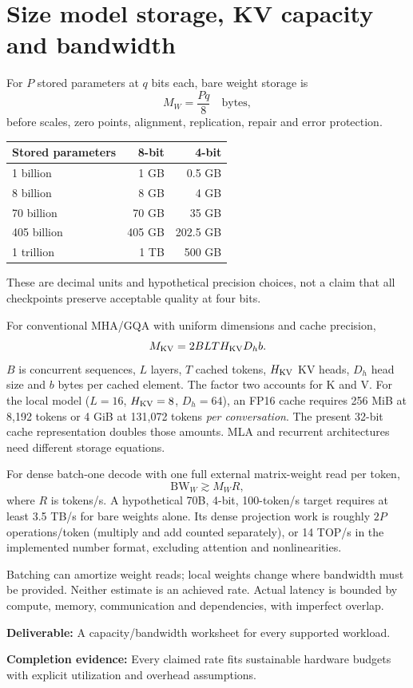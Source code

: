 \documentclass[11pt,a4paper]{article}
\newcommand{\phase}[2]{\clearpage\section{#1}\label{#2}}
\newcommand{\deliver}[2]{\begin{tcolorbox}[colback=pale,colframe=line,boxrule=0.5pt,arc=1mm,left=8pt,right=8pt,top=6pt,bottom=6pt]\textbf{Deliverable:} #1\par\textbf{Completion evidence:} #2\end{tcolorbox}}
\begin{document}
\phase{Size model storage, KV capacity and bandwidth}{sec:sizing}
For $P$ stored parameters at $q$ bits each, bare weight storage is
\[
M_W = \frac{Pq}{8}\quad\text{bytes},
\]
before scales, zero points, alignment, replication, repair and error protection.
\begin{center}
\begin{tabular}{@{}lrr@{}}
\toprule\textbf{Stored parameters} & \textbf{8-bit} & \textbf{4-bit}\\\midrule
1 billion & 1 GB & 0.5 GB\\
8 billion & 8 GB & 4 GB\\
70 billion & 70 GB & 35 GB\\
405 billion & 405 GB & 202.5 GB\\
1 trillion & 1 TB & 500 GB\\\bottomrule
\end{tabular}
\end{center}
These are decimal units and hypothetical precision choices, not a claim that
all checkpoints preserve acceptable quality at four bits.

For conventional MHA/GQA with uniform dimensions and cache precision,
\[
M_{\rm KV}=2BLTH_{\rm KV}D_hb.
\]
$B$ is concurrent sequences, $L$ layers, $T$ cached tokens, $H_{\rm KV}$ KV heads,
$D_h$ head size and $b$ bytes per cached element. The factor two accounts for K and V.
For the local model ($L=16$, $H_{\rm KV}=8$, $D_h=64$), an FP16 cache requires
256 MiB at 8,192 tokens or 4 GiB at 131,072 tokens \emph{per conversation}.
The present 32-bit cache representation doubles those amounts. MLA and recurrent
architectures need different storage equations.

For dense batch-one decode with one full external matrix-weight read per token,
\[
\mathrm{BW}_{W}\gtrsim M_W R,
\]
where $R$ is tokens/s. A hypothetical 70B, 4-bit, 100-token/s target requires
at least 3.5 TB/s for bare weights alone. Its dense projection work is roughly
$2P$ operations/token (multiply and add counted separately), or 14 TOP/s in
the implemented number format, excluding attention and nonlinearities.

Batching can amortize weight reads; local weights change where bandwidth must
be provided. Neither estimate is an achieved rate. Actual latency is bounded
by compute, memory, communication and dependencies, with imperfect overlap.
\deliver{A capacity/bandwidth worksheet for every supported workload.}{Every
claimed rate fits sustainable hardware budgets with explicit utilization and overhead assumptions.}
\end{document}
